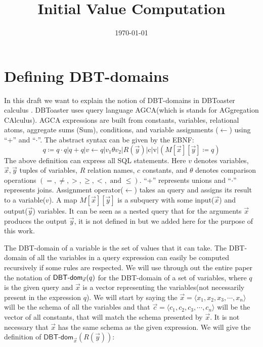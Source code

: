 \documentclass[12pt]{article}
\begin{document}
\title{Initial Value Computation}
\author{}
\date{\today}
\maketitle
\newcommand{\dom}{\textsf{DBT-dom}}
\newcommand{\multip}{\textsf{DBT-multip}}
\newcommand{\InputVars}{\textsf{InputVars}}
\newcommand{\OutputVars}{\textsf{OutputVars}}
\newcommand{\Rel}{\textsf{Rel}}
\newcommand{\Ext}{\textsf{Ext}}

\section{Defining DBT-domains}
\label{sec:definingdomains}
In this draft we want to explain the notion of DBT-domains in DBToaster calculus \cite{1}. DBToaster uses query language AGCA(which is stands for AGgregation CAlculus). 
AGCA expressions are built from constants, variables, relational atoms, aggregate sums (Sum), conditions, and variable assignments ($\gets$) using ``+''  and ``$\cdot$''. The abstract syntax can be given by the EBNF:
\begin{equation}
\label{def:agca}
q\coloneqq  q\cdot q | q + q|v \gets q |v_{1}\theta v_{2}|R(\vec{y})|\text{c}|\text{v}|(M[\vec{x}][\vec{y}]\coloneqq q)
\end{equation}
The above definition can express all SQL statements. Here $v$ denotes variables, $\vec{x},\vec{y}$ tuples of variables, $R$ relation names, $c$ constants, and $\theta$ denotes comparison operations $(=,\neq, >, \geq, <, \text{ and }\leq)$.
 ``+'' represents unions and ``$\cdot$'' represents joins. Assignment operator($\gets$) takes an query and assigns its result to a variable($v$). A map $M[\vec{x}][\vec{y}]$ is a subquery with some input($\vec{x}$) and output($\vec{y}$) variables. It can be seen as a nested query that for the arguments $\vec{x}$ produces the output $\vec{y}$, it is not defined in \cite{1} but we added here for the purpose of this work.

The DBT-domain of a variable is the set of values that it can take. The DBT-domain of all the variables in a query expression can easily be computed recursively if some rules are respected. We will use through out the entire paper the notation of $\text{\dom{}}_{\vec x}(q)$ for the DBT-domain of a set of variables, where $q$ is the given query and $\vec x$ is a vector representing the variables(not necessarily present in the expression $q$). We will start by saying the $\vec x=\langle x_1,x_2,x_3,\cdots,x_n\rangle$ will be the schema of all the variables 
and that $\vec c=\langle c_1,c_2,c_3,\cdots,c_n\rangle$ will be the vector of all constants, that will match the schema presented by $\vec x$. It is not necessary that $\vec{x}$  has the same schema as the given expression. We will give the definition of $\dom{}_{\vec x}(R(\vec y))$:
\end{document}
